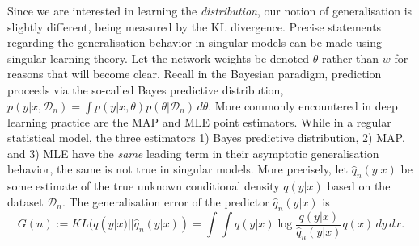 \documentclass[11pt]{article}
\numberwithin{equation}{section}
\theoremstyle{plain}
\theoremstyle{definition}
\begin{document}
Since we are interested in learning the \textit{distribution}, our notion of generalisation is slightly different, being measured by the KL divergence.
Precise statements regarding the generalisation behavior in singular models can be made using singular learning theory.
Let the network weights be denoted $\theta$ rather than $w$ for reasons that will become clear. Recall in the Bayesian paradigm, prediction proceeds via the so-called Bayes predictive distribution,
$
p(y|x, \mathcal D_n) = \int p(y|x,\theta) p(\theta|\mathcal D_n) \,d\theta.
$
More commonly encountered in deep learning practice are the MAP and MLE point estimators.
While in a regular statistical model, the three estimators 1) Bayes predictive distribution, 2) MAP, and 3) MLE have the \textit{same} leading term in their asymptotic generalisation behavior, the same is not true in singular models.
More precisely, let $\hat q_n(y|x)$ be some estimate of the true unknown conditional density $q(y|x)$ based on the dataset $\mathcal D_n$. The generalisation error of the predictor $\hat q_n(y|x)$ is
\begin{equation}
	G(n) := KL (q(y|x) || \hat q_n(y|x) ) = \int \!\int q(y|x) \log \frac{q(y|x)}{\hat q_n(y|x)} q(x) \,dy  \,dx.
	\label{eq:Gn}
\end{equation}
\end{document}
